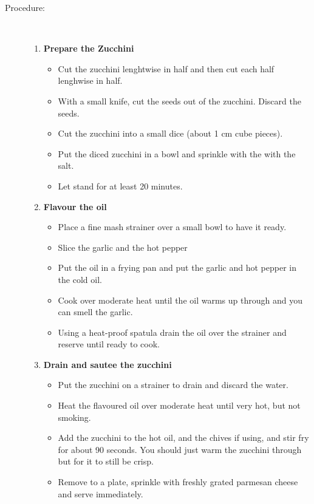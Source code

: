 \documentclass[11pt,letterpaper]{article}
\newcommand \fileName {GarlicParmesanZucchini}
\begin{document}
\begin{description}
\item[Procedure:]\ \\
	\begin{enumerate}
	\item {\bf Prepare the Zucchini}
	\begin{itemize}
	\item Cut the zucchini lenghtwise in half and then cut each half lenghwise in half.
	\item With a small knife, cut the seeds out of the zucchini. Discard the seeds.
	\item Cut the zucchini into a small dice (about 1 cm cube pieces).
	\item  Put the diced zucchini in a bowl and sprinkle with the with the salt.
	\item Let stand for at least 20 minutes.
	\end{itemize}
	\item {\bf Flavour the oil}
	\begin{itemize}
        \item Place a fine mash strainer over a small bowl to have it ready.
	\item Slice the garlic and the hot pepper
	\item Put the oil in a frying pan and put the garlic and hot pepper in the cold oil.
	\item Cook over moderate heat until the oil warms up through and you can smell the garlic.
	\item Using a heat-proof spatula drain the oil over the strainer and reserve until ready to cook.
	\end{itemize}
	\item{\bf Drain and sautee the zucchini}
	\begin{itemize}
	\item Put the zucchini on a strainer to drain and discard the water.
	\item Heat the flavoured oil over moderate heat until very hot, but not smoking.
	\item Add the zucchini to the hot oil, and the chives if using, and stir fry for about 90 seconds. You should just warm the zucchini through but for it to still be crisp.
	\item Remove to a plate, sprinkle with freshly grated parmesan cheese and serve immediately.	
	\end{itemize}
	\end{enumerate}
\end{description}

\end{document}

